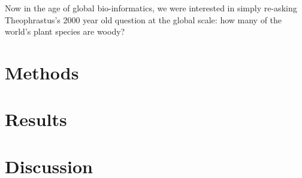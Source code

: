 \documentclass[12pt]{article}
\begin{document}
Now in the age of global bio-informatics, we were interested in simply re-asking Theophrastus's 2000 year old question at the global scale: how many of the world's plant species are woody?  

\section{Methods}

\section{Results}

\section{Discussion}



\end{document}

